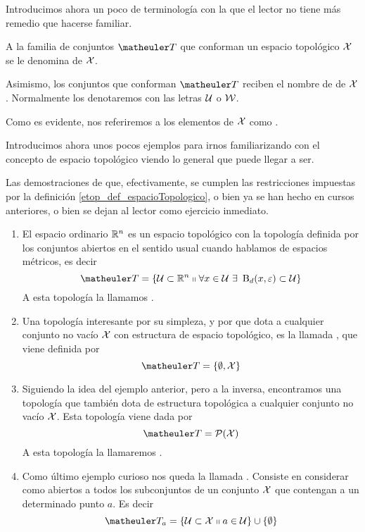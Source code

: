 Introducimos ahora un poco de terminología con la que el lector no tiene más remedio que hacerse familiar.
\begin{obs}[Terminología]
	\label{etop_obs_terminologia}
	A la familia de conjuntos $\T$ que conforman un espacio topológico $\mathcal{X}$ se le denomina  de $\mathcal{X}$.
	
	Asimismo, los conjuntos que conforman $\T$ reciben el nombre de  de $\mathcal{X}$. Normalmente los denotaremos con las letras $\mathcal{U}$ o $\mathcal{W}$.
	
	Como es evidente, nos referiremos a los elementos de $\mathcal{X}$ como .
\end{obs}
Introducimos ahora unos pocos ejemplos para irnos familiarizando con el concepto de espacio topológico viendo lo general que puede llegar a ser.
\begin{exa}[Topologías]
	\label{etop_exa_topologias}
	Las demostraciones de que, efectivamente, se cumplen las restricciones impuestas por la definición \ref{etop_def_espacioTopologico}, o bien ya se han hecho en cursos anteriores, o bien se dejan al lector como ejercicio inmediato.
	\begin{enumerate}
		\item El espacio ordinario $\mathbb{R}^n$ es un espacio topológico con la topología definida por los conjuntos abiertos en el sentido usual cuando hablamos de espacios métricos, es decir
		\begin{equation}
		\label{etop_eq_topologiaRn}
		\T = \{\U\subset\R^n\tq \forall x\in\U\ \exists\  \bola_{d}(x,\varepsilon)\subset\U\}
		\end{equation}
		A esta topología la llamamos .
		\item Una topología interesante por su simpleza, y por que dota a cualquier conjunto no vacío $\mathcal{X}$ con estructura de espacio topológico, es la llamada , que viene definida por \begin{equation}
		\label{etop_eq_topologiaTrivial}
		\T=\{\emptyset, \X\}
		\end{equation}
		\item Siguiendo la idea del ejemplo anterior, pero a la inversa, encontramos una topología que también dota de estructura topológica a cualquier conjunto no vacío $\mathcal{X}$. Esta topología viene dada por
		\begin{equation}
		\label{etop_eq_topologiaDiscreta}
		\T = \partes(\X)
		\end{equation}
		A esta topología la llamaremos .
		\item Como último ejemplo curioso nos queda la llamada . Consiste en considerar como abiertos a todos los subconjuntos de un conjunto $\mathcal{X}$ que contengan a un determinado punto $a$. Es decir
		\begin{equation}
		\label{etop_eq_topologiaPunto}
		\T_a = \{\U \subset \X\tq a\in\U\}\cup\{\emptyset\}
		\end{equation}
		

\end{enumerate}
\end{exa}

